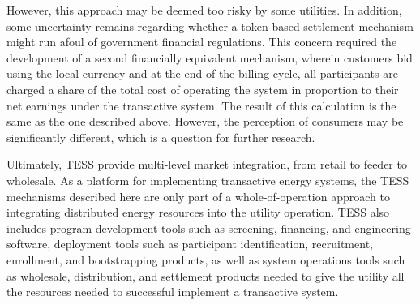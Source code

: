 However, this approach may be deemed too risky by some utilities. In addition, some uncertainty remains regarding whether a token-based settlement mechanism might run afoul of government financial regulations. This concern required the development of a second financially equivalent mechanism, wherein customers bid using the local currency and at the end of the billing cycle, all participants are charged a share of the total cost of operating the system in proportion to their net earnings under the transactive system. The result of this calculation is the same as the one described above. However, the perception of consumers may be significantly different, which is a question for further research. 

Ultimately, TESS provide multi-level market integration, from retail to feeder to wholesale. As a platform for implementing transactive energy systems, the TESS mechanisms described here are only part of a whole-of-operation approach to integrating distributed energy resources into the utility operation.  TESS also includes program development tools such as screening, financing, and engineering software, deployment tools such as participant identification, recruitment, enrollment, and bootstrapping products, as well as system operations tools such as wholesale, distribution, and settlement products needed to give the utility all the resources needed to successful implement a transactive system.


